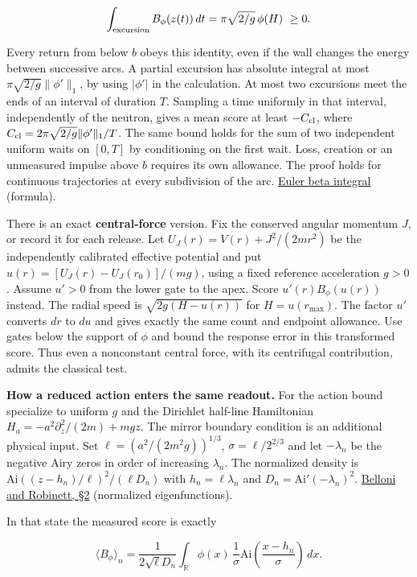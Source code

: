 \documentclass[11pt,a4paper]{article}
\begin{document}
\[
 \int_{\rm excursion} B_\phi(z(t))\,dt
       =\pi\sqrt{2/g}\,\phi(H)\ \ge 0 .
\]

Every return from below \(b\) obeys this identity, even if the wall
changes the energy between successive arcs. A partial excursion has
absolute integral at most \(\pi\sqrt{2/g}\|\phi'\|_1\), by using
\(|\phi'|\) in the calculation. At most two excursions meet the ends of
an interval of duration \(T\). Sampling a time uniformly in that
interval, independently of the neutron, gives a mean score at least
\(-C_{\rm cl}\), where \(C_{\rm cl}=2\pi\sqrt{2/g}\|\phi'\|_1/T\). The
same bound holds for the sum of two independent uniform waits on
\([0,T]\) by conditioning on the first wait. Loss, creation or an
unmeasured impulse above \(b\) requires its own allowance. The proof
holds for continuous trajectories at every subdivision of the arc.
\href{https://dlmf.nist.gov/5.12.E1}{Euler beta integral} (formula).

There is an exact \textbf{central-force} version. Fix the conserved
angular momentum \(J\), or record it for each release. Let
\(U_J(r)=V(r)+J^2/(2mr^2)\) be the independently calibrated effective
potential and put \(u(r)=[U_J(r)-U_J(r_0)]/(mg)\), using a fixed
reference acceleration \(g>0\). Assume \(u'>0\) from the lower gate to
the apex. Score \(u'(r)B_\phi(u(r))\) instead. The radial speed is
\(\sqrt{2g(H-u(r))}\) for \(H=u(r_{\max})\). The factor \(u'\) converts
\(dr\) to \(du\) and gives exactly the same count and endpoint
allowance. Use gates below the support of \(\phi\) and bound the
response error in this transformed score. Thus even a nonconstant
central force, with its centrifugal contribution, admits the classical
test.

\textbf{How a reduced action enters the same readout.} For the action
bound specialize to uniform \(g\) and the Dirichlet half-line
Hamiltonian \(H_a=-a^2\partial_z^2/(2m)+mgz\). The mirror boundary
condition is an additional physical input. Set
\(\ell=(a^2/(2m^2g))^{1/3}\), \(\sigma=\ell/2^{2/3}\) and let
\(-\lambda_n\) be the negative Airy zeros in order of increasing
\(\lambda_n\). The normalized density is
\(\mathrm{Ai}((z-h_n)/\ell)^2/(\ell D_n)\) with \(h_n=\ell\lambda_n\)
and \(D_n=\mathrm{Ai}'(-\lambda_n)^2\).
\href{https://arxiv.org/pdf/1007.1623}{Belloni and Robinett, §2}
(normalized eigenfunctions).

In that state the measured score is exactly

\[
 \langle B_\phi\rangle_n =
 \frac{1}{2\sqrt{\ell}D_n}
 \int_{\mathbb R}\phi(x)\,\frac1{\sigma}
        \mathrm{Ai}\!\left(\frac{x-h_n}{\sigma}\right)\,dx .
\]
\end{document}
